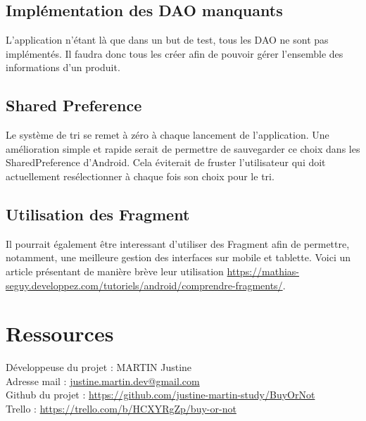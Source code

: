 \documentclass[report]{BetterDocument}
\begin{document}
		\section{Implémentation des DAO manquants}

			L'application n'étant là que dans un but de test, tous les DAO ne sont pas implémentés. Il faudra donc tous les créer afin de pouvoir gérer l'ensemble des informations d'un produit.

		\section{Shared Preference}

			Le système de tri se remet à zéro à chaque lancement de l'application. Une amélioration simple et rapide serait de permettre de sauvegarder ce choix dans les SharedPreference d'Android. Cela éviterait de fruster l'utilisateur qui doit actuellement resélectionner à chaque fois son choix pour le tri.

		\section{Utilisation des Fragment}

			Il pourrait également être interessant d'utiliser des Fragment afin de permettre, notamment, une meilleure gestion des interfaces sur mobile et tablette. Voici un article présentant de manière brève leur utilisation \url{https://mathias-seguy.developpez.com/tutoriels/android/comprendre-fragments/}.


	\chapter{Ressources}

		\noindent Développeuse du projet : MARTIN Justine\\
		Adresse mail : \href{mailto:justine.martin.dev@gmail.com}{justine.martin.dev@gmail.com}\\
		Github du projet : \url{https://github.com/justine-martin-study/BuyOrNot}\\
		Trello : \url{https://trello.com/b/HCXYRgZp/buy-or-not}
\end{document}
